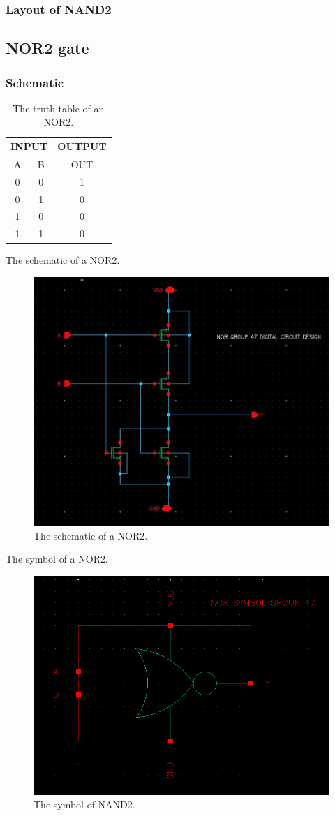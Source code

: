 \subsubsection{Layout of NAND2}
\subsection{NOR2 gate}

\subsubsection{Schematic}

\begin{table}[H]
	\centering
	\begin{tabular}{|c|c|c|}
		\hline
		\multicolumn{2}{|c|}{INPUT} & OUTPUT \\
		\hline
		A & B  & OUT\\
		\hline
		0 & 0 & 1 \\
		\hline
		0 & 1 & 0\\
		\hline
		1 & 0 & 0\\
		\hline
		1 & 1 & 0\\
		\hline
	\end{tabular}
	\caption{The truth table of an NOR2.}
	\label{t_the truth table of NOR2}
\end{table}

The schematic of a NOR2.

\begin{figure}[H]
	\centering
	\includegraphics[width=.6\linewidth]{section/EX1/NOR/EX1_NOR2_schematic.png}
	\caption{The schematic of a NOR2.}
	\label{f_EX1_NOR2_schematic}
\end{figure} 

The symbol of a NOR2.

\begin{figure}[H]
	\centering
	\includegraphics[width=.6\linewidth]{section/EX1/NOR/EX1_NOR2_symbol.png}
	\caption{The symbol of NAND2.}
	\label{f_EX1_NOR2_symbol}
\end{figure}

